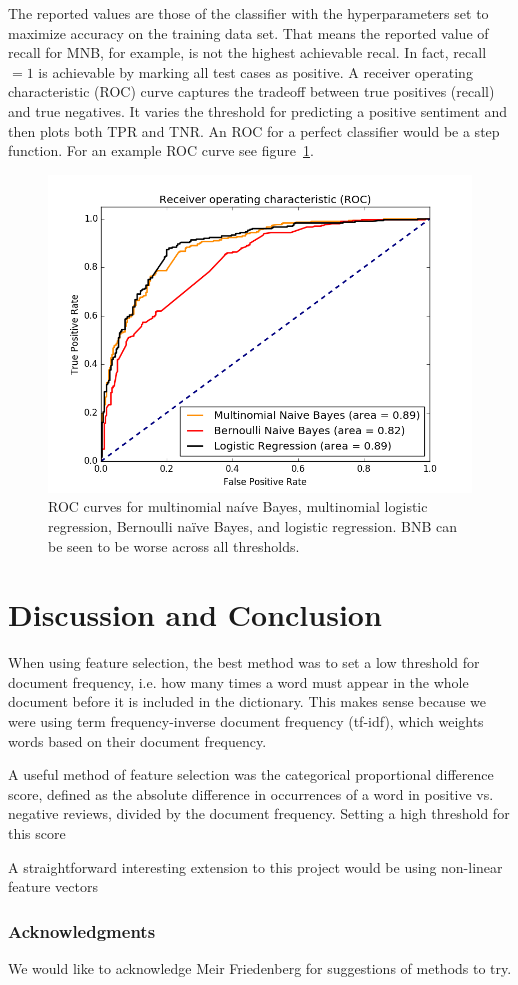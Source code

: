 \documentclass{article} %
\begin{document}
	The reported values are those of the classifier with the hyperparameters set to maximize accuracy on the training data set. That means the reported value of recall for MNB, for example, is not the highest achievable recal. In fact, recall $=1$ is achievable by marking all test cases as positive. A receiver operating characteristic (ROC) curve captures the tradeoff between true positives (recall) and true negatives. It varies the threshold for predicting a positive sentiment and then plots both TPR and TNR. An ROC for a perfect classifier would be a step function. For an example ROC curve see figure~\ref{fig:roc}.
	\begin{figure}[h]
		\centering
		\includegraphics[scale=.5]{ROC}
		\caption{ROC curves for multinomial na\'ive Bayes, multinomial logistic regression, Bernoulli na\"ive Bayes, and logistic regression. BNB can be seen to be worse across all thresholds.}
		\label{fig:roc}
	\end{figure}
		
	\section{Discussion and Conclusion}
	
	When using feature selection, the best method was to set a low threshold for document frequency, i.e. how many times a word must appear in the whole document before it is included in the dictionary. This makes sense because we were using term frequency-inverse document frequency (tf-idf), which weights words based on their document frequency. 
	
	A useful method of feature selection was the categorical proportional difference score, defined as the absolute difference in occurrences of a word in positive vs. negative reviews, divided by the document frequency. Setting a high threshold for this score
	
	A straightforward interesting extension to this project would be using non-linear feature vectors 
	
	\subsubsection*{Acknowledgments}
	
	We would like to acknowledge Meir Friedenberg for suggestions of methods to try.
	
	
	
	
	
\end{document}
